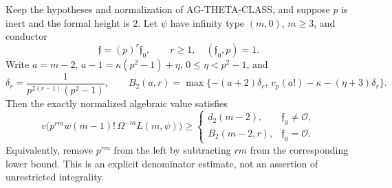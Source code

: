 \begin{proposition}
Keep the hypotheses and normalization of AG-THETA-CLASS, and
suppose $p$ is inert and the formal height is $2$.
Let $\psi$ have infinity type $(m,0)$, $m\ge3$, and conductor
\[
 \mathfrak f=(p)^r\mathfrak f_0,\qquad r\ge1,
 \quad(\mathfrak f_0,p)=1.
\]
Write $a=m-2$, $a-1=\kappa(p^2-1)+\eta$,
$0\le\eta<p^2-1$, and
\[
 \delta_r=\frac1{p^{2(r-1)}(p^2-1)},\qquad
 B_2(a,r)=\max\{-(a+2)\delta_r,\,
       v_p(a!)-\kappa-(\eta+3)\delta_r\}.
\]
Then the exactly normalized algebraic value satisfies
\begin{equation}\label{eq:ag-cm-p-conductor-bound}
 v\bigl(p^{rm}w(m-1)!\,\Omega^{-m}L(m,\psi)\bigr)
 \ge
 \begin{cases}
 d_2(m-2),&\mathfrak f_0\ne\mathcal O,\\
 B_2(m-2,r),&\mathfrak f_0=\mathcal O.
 \end{cases}
\end{equation}
Equivalently, remove $p^{rm}$ from the left by subtracting
$rm$ from the corresponding lower bound. This is an explicit
denominator estimate, not an assertion of unrestricted integrality.
\end{proposition}
